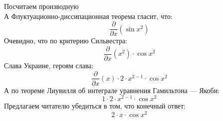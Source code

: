 \documentclass[12pt]{article}
\begin{document}
\newpage                                                  
\Huge                                                     
	Посчитаем производную\\                                
\newline                                                  
\normalfont                                               
\normalsize                                               
А Флуктуационно-диссипационная теорема гласит, что:  \begin{equation}
	\frac{\partial}{\partial x}\left( \sin {x^{2}}\right) 
\end{equation}
Очевидно, что по критерию Сильвестра:  \begin{equation}
	\frac{\partial}{\partial x}\left( x^{2}\right) \cdot \cos {x^{2}}
\end{equation}
Слава Украине, героям слава:  \begin{equation}
	\frac{\partial}{\partial x}\left( x\right) \cdot 2\cdot x^{2 - 1}\cdot \cos {x^{2}}
\end{equation}
А по теореме Лиувилля об интеграле уравнения Гамильтона — Якоби:  \begin{equation}
	1\cdot 2\cdot x^{2 - 1}\cdot \cos {x^{2}}
\end{equation}
Предлагаем читателю убедиться в том, что конечный ответ: 
\begin{equation}
	2\cdot x\cdot \cos {x^{2}}
\end{equation}
\end{document}
